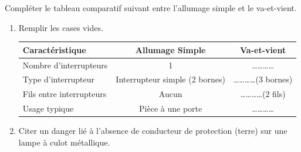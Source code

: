 \documentclass[11pt]{article}
\begin{document}
\begin{exercice}
Compléter le tableau comparatif suivant entre l'allumage simple et le va-et-vient.
\begin{enumerate}
    \item Remplir les cases vides.
    \begin{tabular}{|l|c|c|}
    \hline
    \textbf{Caractéristique} & \textbf{Allumage Simple} & \textbf{Va-et-vient} \\ \hline
    Nombre d'interrupteurs & 1 & \ldots\ldots\ldots\ldots \\ \hline
    Type d'interrupteur & Interrupteur simple (2 bornes) & \ldots\ldots\ldots\ldots (3 bornes) \\ \hline
    Fils entre interrupteurs & Aucun & \ldots\ldots\ldots\ldots (2 fils) \\ \hline
    Usage typique & Pièce à une porte & \ldots\ldots\ldots\ldots \\ \hline
    \end{tabular}
    \item Citer un danger lié à l'absence de conducteur de protection (terre) sur une lampe à culot métallique.
\end{enumerate}
\end{exercice}
\end{document}
